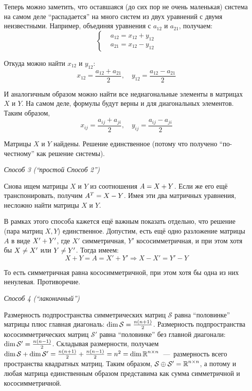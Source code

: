\documentclass[a4paper,12pt]{article}
\begin{document}
\begin{solution}
    Теперь можно заметить, что оставшаяся (до сих пор не очень маленькая) система на самом деле ``распадается'' на много систем из двух уравнений с двумя неизвестными.
    Например, объединяя уравнения с $a_{12}$ и $a_{21}$, получаем:
    \[
      \left\{
        \begin{aligned}
          &a_{12} = x_{12} + y_{12}\\
          &a_{21} = x_{12} - y_{12}
        \end{aligned}
      \right.
    \]
    
    Откуда можно найти $x_{12}$ и $y_{12}$:
    \[
      x_{12} = \frac{a_{12} + a_{21}}{2},\quad y_{12} = \frac{a_{12} - a_{21}}{2}
    \]
    
    И аналогичным образом можно найти все недиагональные элементы в матрицах $X$ и $Y$.
    На самом деле, формулы будут верны и для диагональных элементов.
    Таким образом,
    \[
      x_{ij} = \frac{a_{ij} + a_{ji}}{2},\quad y_{ij} = \frac{a_{ij} - a_{ji}}{2}
    \]
    
    Матрицы $X$ и $Y$ найдены.
    Решение единственное (потому что получено ``по-честному'' как решение системы).
    
    \bigskip
    
    \emph{Способ 3 (``простой Способ 2'')}
    
    Снова ищем матрицы $X$ и $Y$ из соотношения $A \hm= X \hm+ Y$.
    Если же его ещё транспонировать, получим $A^T \hm= X \hm- Y$.
    Имея эти два матричных уравнения, несложно найти матрицы $X$ и $Y$.
    
    В рамках этого способа кажется ещё важным показать отдельно, что решение (пара матриц $X, Y$) единственное.
    Допустим, есть ещё одно разложение матрицы $A$ в виде $X' \hm+ Y'$, где $X'$ симметричная, $Y'$ кососимметричная, и при этом хотя бы $X \hm{\not=} X'$ или $Y \hm{\not= Y'}$.
    Тогда имеем:
    \[
      X + Y = A = X' + Y' \Rightarrow X - X' = Y' - Y
    \]
    
    То есть симметричная равна кососимметричной, при этом хотя бы одна из них ненулевая.
    Противоречие.
  \end{solution}
  
  
  \bigskip
    
  \emph{Способ 4 (``лаконичный'')}
  
  Размерность подпространства симметрических матриц $\mathcal S$ равна ``половинке'' матрицы плюс главная диагональ: $\dim \mathcal S \hm= \frac{n(n+1)}{2}$.
  Размерность подпространства кососимметрических матриц $\mathcal S'$ равна ``половинке'' без главной диагонали: $\dim \mathcal S' \hm= \frac{n(n-1)}{2}$.
  Складывая размерности, получаем $\dim \mathcal S \hm+ \dim \mathcal S' \hm= \frac{n(n+1)}{2} \hm+ \frac{n(n-1)}{2} \hm= n^2 \hm= \dim \RR^{n \times n}$~---~размерность всего пространства квадратных матриц.
  Таким образом, $\mathcal S \hm\oplus \mathcal S' \hm= \RR^{n\times n}$, а потому и любая матрица единственным образом представима как сумма симметричной и кососимметричной.
  
\end{document}
